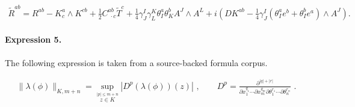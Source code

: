 \documentclass[11pt]{article}
\begin{document}
\begin{align*}\tilde{R}^{ab}=R^{ab}-K^a_c\wedge K^{cb}+\frac{1}{2}C^{ab}_{\;\cdot c}\tilde {T}^c+\frac{1}{4}\gamma^I_J \gamma^K_L\theta^a_I \theta^b_K A^J\wedge A^L+i\left(DK^{ab}-\frac{1}{4}\gamma^I_J(\theta^a_Ie^b+\theta^b_Ie^a)\wedge A^J\right). \end{align*}

\paragraph{Expression 5.} The following expression is taken from a source-backed formula corpus.

\begin{align*}\|\lambda(\phi)\|_{K,m+n}=\sup_{\stackrel{|p|\leq m+n}{z \in K}}|D^p (\lambda(\phi))(z)|\,\,,\qquad D^p=\frac{\partial^{|q|+|r|}}{\partial x^{q_1}_1 \cdots \partial x^{q_m}_m\partial\theta^{r_1}_1 \cdots \partial\theta^{r_n}_n}\,\,. \end{align*}
\end{document}
